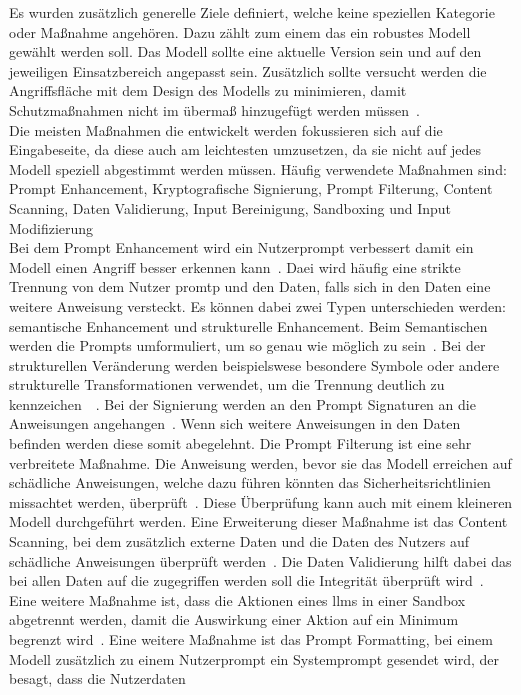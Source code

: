 Es wurden zusätzlich generelle Ziele definiert, welche keine speziellen Kategorie oder Maßnahme angehören. Dazu zählt zum einem das ein robustes Modell gewählt werden soll.
Das Modell sollte eine aktuelle Version sein und auf den jeweiligen Einsatzbereich angepasst sein. Zusätzlich sollte versucht werden die Angriffsfläche mit dem Design des Modells 
zu minimieren, damit Schutzmaßnahmen nicht im übermaß hinzugefügt werden müssen~\cite{sm04}. \\
Die meisten Maßnahmen die entwickelt werden fokussieren sich auf die Eingabeseite, da diese auch am leichtesten umzusetzen, da sie nicht auf jedes Modell speziell abgestimmt
werden müssen. Häufig verwendete Maßnahmen sind: Prompt Enhancement, Kryptografische Signierung, Prompt Filterung, Content Scanning, Daten Validierung, Input Bereinigung, 
Sandboxing und Input Modifizierung \\
Bei dem Prompt Enhancement wird ein Nutzerprompt verbessert damit ein Modell einen Angriff besser erkennen kann~\cite[7]{sm09}. Daei wird häufig eine strikte Trennung von 
dem Nutzer promtp und den Daten, falls sich in den Daten eine weitere Anweisung versteckt. Es können dabei zwei Typen unterschieden werden: semantische Enhancement und
strukturelle Enhancement. Beim Semantischen werden die Prompts umformuliert, um so genau wie möglich zu sein~\cite[55]{sm11}. Bei der strukturellen Veränderung werden 
beispielswese besondere Symbole oder andere strukturelle Transformationen verwendet, um die Trennung deutlich zu kennzeichen~\cite[7]{sm09}~\cite[55]{sm11}. Bei der Signierung
werden an den Prompt Signaturen an die Anweisungen angehangen~\cite[4]{pi9}. Wenn sich weitere Anweisungen in den Daten befinden werden diese somit abegelehnt. Die Prompt
Filterung ist eine sehr verbreitete Maßnahme. Die Anweisung werden, bevor sie das Modell erreichen auf schädliche Anweisungen, welche dazu führen könnten das Sicherheitsrichtlinien
missachtet werden, überprüft~\cite{sm04}. Diese Überprüfung kann auch mit einem kleineren Modell durchgeführt werden. Eine Erweiterung dieser Maßnahme ist das Content Scanning, bei dem zusätzlich externe Daten und die Daten des Nutzers auf schädliche
Anweisungen überprüft werden~\cite{sm04}. Die Daten Validierung hilft dabei das bei allen Daten auf die zugegriffen werden soll die Integrität überprüft wird~\cite{sm04}.
Eine weitere Maßnahme ist, dass die Aktionen eines \ac{llm}s in einer Sandbox abgetrennt werden, damit die Auswirkung einer Aktion auf ein Minimum begrenzt wird~\cite[4]{sm08}.
Eine weitere Maßnahme ist das Prompt Formatting, bei einem Modell zusätzlich zu einem Nutzerprompt ein Systemprompt gesendet wird, der besagt, dass die Nutzerdaten

